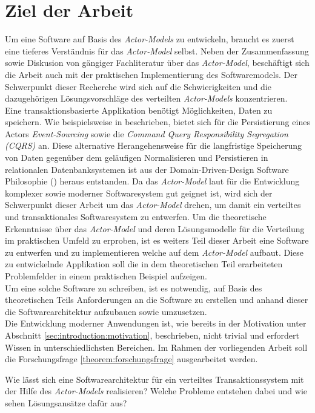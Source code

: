 \section{Ziel der Arbeit}
\label{sec:introduction:workGoal}
\label{sec:introduction:forschungsfrage}
Um eine Software auf Basis des \textit{Actor-Models} zu entwickeln, braucht es zuerst eine tieferes Verständnis für das \textit{Actor-Model} selbst. Neben der Zusammenfassung sowie Diskusion von gängiger Fachliteratur über das \textit{Actor-Model}, beschäftigt sich die Arbeit auch mit der praktischen Implementierung des Softwaremodels. Der Schwerpunkt dieser Recherche wird sich auf die Schwierigkeiten und die dazugehörigen Lösungsvorschläge des verteilten \textit{Actor-Models} konzentrieren. \\
Eine transaktionsbasierte Applikation benötigt Möglichkeiten, Daten zu speichern. Wie beispielsweise in \cite{Vernon2015ReactiveAkka} beschrieben, bietet sich für die Persistierung eines Actors \textit{Event-Sourcing} sowie die \textit{Command Query Responsibility Segregation (CQRS)} an. Diese alternative Herangehensweise für die langfristige Speicherung von Daten gegenüber dem geläufigen Normalisieren und Persistieren in relationalen Datenbanksystemen ist aus der Domain-Driven-Design Software Philosophie (\cite{Evans2004Domain-drivenSoftware}) heraus entstanden. Da das \textit{Actor-Model} laut \cite{Vernon2015ReactiveAkka} für die Entwicklung komplexer sowie moderner Softwaresystem gut geignet ist, wird sich der Schwerpunkt dieser Arbeit um das \textit{Actor-Model} drehen, um damit ein verteiltes und transaktionales Softwaresystem zu entwerfen.
Um die theoretische Erkenntnisse über das \textit{Actor-Model} und deren Lösungsmodelle für die Verteilung im praktischen Umfeld zu erproben, ist es weiters Teil dieser Arbeit eine Software zu entwerfen und zu implementieren welche auf dem \textit{Actor-Model} aufbaut. Diese zu entwickelnde Applikation soll die in dem theoretischen Teil erarbeiteten Problemfelder in einem praktischen Beispiel aufzeigen. \\
Um eine solche Software zu schreiben, ist es notwendig, auf Basis des theoretischen Teils Anforderungen an die Software zu erstellen und anhand dieser die Softwarearchitektur aufzubauen sowie umzusetzen. \\
Die Entwicklung moderner Anwendungen ist, wie bereits in der Motivation unter Abschnitt \ref{sec:introduction:motivation}, beschrieben, nicht trivial und erfordert Wissen in unterschiedlichsten Bereichen. Im Rahmen der vorliegenden Arbeit soll die Forschungsfrage \ref{theorem:forschungsfrage} ausgearbeitet werden. 
\begin{Theorem}
\label{theorem:forschungsfrage}
Wie lässt sich eine Softwarearchitektur für ein verteiltes Transaktionssystem mit der Hilfe des \textit{Actor-Models} realisieren? Welche Probleme entstehen dabei und wie sehen Lösungsansätze dafür aus?
\end{Theorem}


